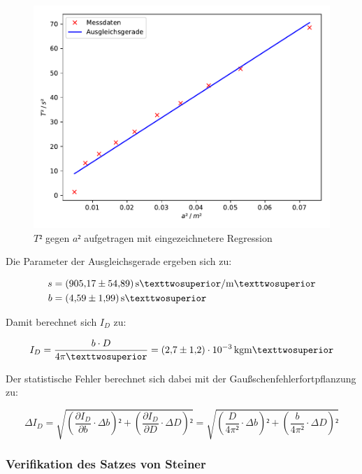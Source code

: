\begin{figure}
  \centering
  \includegraphics[scale=0.8]{content/plot2.pdf}
  \caption{$T²$ gegen $a²$ aufgetragen mit eingezeichnetere Regression}
  \label{fig:plot2}
\end{figure}

Die Parameter der Ausgleichsgerade ergeben sich zu: 

\begin{align*}
s &= \SI{905.17+-54.89}{\second²\per\meter²}\\
b &= \SI{4.59+-1.99}{\second²}
\end{align*}

Damit berechnet sich $I_D$ zu: 

\begin{equation*}
I_D = \frac{b\cdot D}{4\pi²} = \SI{2.7+-1.2e-3}{\kilo\gram\meter²}
\end{equation*}

Der statistische Fehler berechnet sich dabei mit der Gaußschenfehlerfortpflanzung 
zu: 

\begin{equation*}
\Delta I_D = \sqrt{\left(\frac{\partial I_D}{\partial b}\cdot \Delta b\right)²+\left(\frac{\partial I_D}{\partial D}\cdot \Delta D\right)²}
= \sqrt{\left(\frac{D}{4\pi²}\cdot \Delta b\right)²+\left(\frac{b}{4\pi²}\cdot \Delta D\right)²}
\end{equation*}

\subsubsection{Verifikation des Satzes von Steiner}


